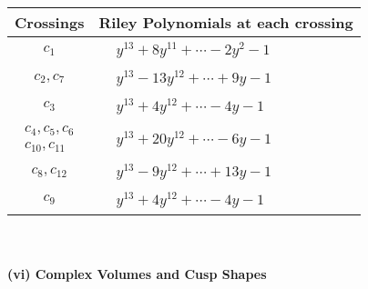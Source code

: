 \documentclass[1p]{elsarticle_modified}
\theoremstyle{definition}
\begin{document}
\begin{tabular}{m{50pt}|m{274pt}}
Crossings & \hspace{64pt}Riley Polynomials at each crossing \\
\hline $$\begin{aligned}c_{1}\end{aligned}$$&$\begin{aligned}
&y^{13}+8 y^{11}+\cdots-2 y^2-1
\end{aligned}$\\
\hline $$\begin{aligned}c_{2},c_{7}\end{aligned}$$&$\begin{aligned}
&y^{13}-13 y^{12}+\cdots+9 y-1
\end{aligned}$\\
\hline $$\begin{aligned}c_{3}\end{aligned}$$&$\begin{aligned}
&y^{13}+4 y^{12}+\cdots-4 y-1
\end{aligned}$\\
\hline $$\begin{aligned}c_{4},c_{5},c_{6}\\c_{10},c_{11}\end{aligned}$$&$\begin{aligned}
&y^{13}+20 y^{12}+\cdots-6 y-1
\end{aligned}$\\
\hline $$\begin{aligned}c_{8},c_{12}\end{aligned}$$&$\begin{aligned}
&y^{13}-9 y^{12}+\cdots+13 y-1
\end{aligned}$\\
\hline $$\begin{aligned}c_{9}\end{aligned}$$&$\begin{aligned}
&y^{13}+4 y^{12}+\cdots-4 y-1
\end{aligned}$\\
\hline
\end{tabular}\\~\\
\newpage\flushleft \textbf{(vi) Complex Volumes and Cusp Shapes}
\end{document}
